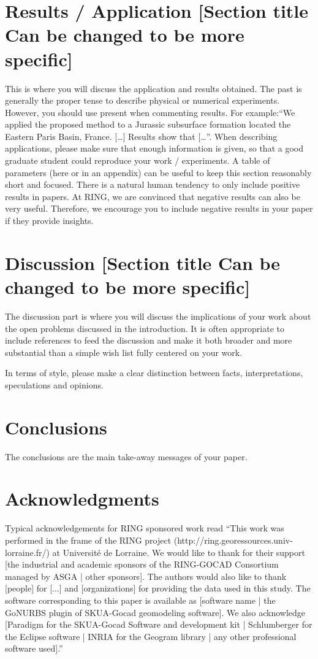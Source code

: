 \documentclass[final]{ring}
\begin{document}
\section{Results / Application [Section title Can be changed to be more specific]}
\label{sec:appli}

This is where you will discuss the application and results obtained. The past is generally the proper tense to describe physical or numerical experiments. However, you should use present when commenting results. For example:``We applied the proposed method to a Jurassic subsurface formation located the Eastern Paris Basin, France. […] Results show that […''.
When describing applications, please make sure that enough information is given, so that a good graduate student could reproduce your work / experiments. A table of parameters (here or in an appendix) can be useful to keep this section reasonably short and focused.
There is a natural human tendency to only include positive results in papers. At RING, we are convinced that negative results can also be very useful. Therefore, we encourage you to include negative results in your paper if they provide insights. 


\section{Discussion [Section title Can be changed to be more specific]}
\label{sec:discussion}

The discussion part is where you will discuss the implications of your work about the open problems discussed in the introduction. It is often appropriate to include references to feed the discussion and make it both broader and more substantial than a simple wish list fully centered on your work. 

In terms of style, please make a clear distinction between facts, interpretations, speculations and opinions. 

\section*{Conclusions}

The conclusions are the main take-away messages of your paper. 

\section*{Acknowledgments}

Typical acknowledgements for RING sponsored work read ``This work was performed in the frame of the RING project (http://ring.georessources.univ-lorraine.fr/) at Université de Lorraine. We would like to thank for their support [the industrial and academic sponsors of the RING-GOCAD Consortium managed by ASGA | other sponsors]. The authors would also like to thank [people] for [...] and [organizations] for providing the data used in this study. The software corresponding to this paper is available as [software name | the GoNURBS plugin of SKUA-Gocad geomodeling software]. We also acknowledge [Paradigm for the SKUA-Gocad Software and development kit | Schlumberger for the Eclipse software | INRIA for the Geogram library | any other professional software used].''


\end{document}
